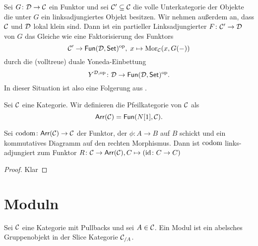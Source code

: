 \begin{Bem}
     Sei \(G\colon \mathcal{D}\to \mathcal{C}\) ein Funktor und sei \(\mathcal{C}'\subseteq \mathcal{C}\) die volle Unterkategorie der
 Objekte die unter \(G\) ein linksadjungiertes Objekt besitzen. Wir nehmen außerdem an, dass \(\mathcal{C}\)
 und \(\mathcal{D}\) lokal klein sind.
 Dann ist ein partieller Linksadjungierter \(F\colon\mathcal{C}'\to \mathcal{D}\) von \(G\) das Gleiche wie eine Faktorisierung des Funktors
 \[\mathcal{C}'\to\mathsf{Fun}(\mathcal{D},\mathsf{Set})^{\mathrm{op}},\; x\mapsto\operatorname{Mor}_{\mathcal{C}}(x,G(-))\]
 durch die (volltreue) duale Yoneda-Einbettung \[Y^{\mathcal{D},\mathrm{op}}\colon \mathcal{D}\to\mathsf{Fun}(\mathcal{D},\mathsf{Set})^{\mathrm{op}}.\] In dieser Situation
 ist also  eine Folgerung aus .
\end{Bem}
\begin{Def}\label{Def:ArrowCat}
    Sei \(\mathcal{C}\) eine Kategorie. Wir definieren die Pfeilkategorie von \(\mathcal{C}\) als \[\mathsf{Arr}(\mathcal{C})=\mathsf{Fun}(N[1],\mathcal{C}).\]
\end{Def}
\begin{Lemma}\label{Lem:CodomAdj}
    Sei \(\operatorname{codom}\colon \mathsf{Arr}(\mathcal{C})\to \mathcal{C}\) der Funktor, der \(\phi\colon A\to B\) auf \(B\) schickt und ein kommutatives Diagramm auf den rechten Morphismus.
    Dann ist \(\operatorname{codom}\) links-adjungiert zum Funktor \(R\colon \mathcal{C}\to \mathsf{Arr}(\mathcal{C}), C\mapsto (\mathrm{id}\colon C\to C)\)
\end{Lemma}
\begin{proof}
    Klar
\end{proof}
\section{Moduln}
\begin{Def}
    Sei \(\mathcal{C}\) eine Kategorie mit Pullbacks und sei \(A\in\mathcal{C}\). Ein Modul ist ein abelsches Gruppenobjekt in der Slice Kategorie \(\mathcal{C}_{/A}\).
\end{Def}